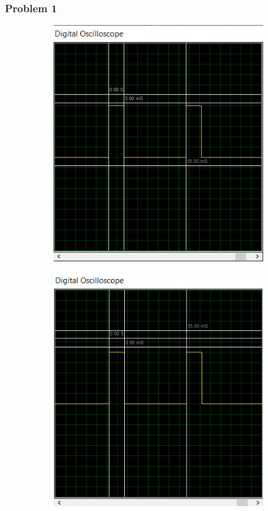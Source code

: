 \documentclass{lab_sheet}
\begin{document}
    \subsubsection*{Problem 1}
    \begin{figure}[H]
        \begin{subfigure}{.5\textwidth}
        \centering
        \includegraphics[width=.8\linewidth,frame]{../Figures/1a.png}
        \caption{}
        \label{fig:prob1_a}
        \end{subfigure}
        \begin{subfigure}{.5\textwidth}
            \centering
            \includegraphics[width=.8\linewidth,frame]{../Figures/1b.png}

\end{subfigure}
\end{figure}
\end{document}
